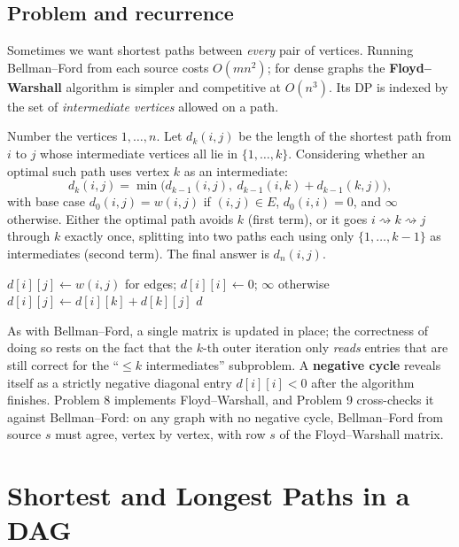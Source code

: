 \documentclass[11pt]{article}
\begin{document}
\subsection{Problem and recurrence}

Sometimes we want shortest paths between \emph{every} pair of vertices. Running Bellman--Ford
from each source costs $O(mn^2)$; for dense graphs the \textbf{Floyd--Warshall} algorithm is
simpler and competitive at $O(n^3)$. Its DP is indexed by the set of \emph{intermediate
vertices} allowed on a path.

Number the vertices $1, \ldots, n$. Let $d_k(i,j)$ be the length of the shortest path from
$i$ to $j$ whose intermediate vertices all lie in $\{1, \ldots, k\}$. Considering whether an
optimal such path uses vertex $k$ as an intermediate:
\[
d_k(i,j) = \min\big(d_{k-1}(i,j),\ d_{k-1}(i,k) + d_{k-1}(k,j)\big),
\]
with base case $d_0(i,j) = w(i,j)$ if $(i,j) \in E$, $d_0(i,i) = 0$, and $\infty$ otherwise.
Either the optimal path avoids $k$ (first term), or it goes $i \rightsquigarrow k
\rightsquigarrow j$ through $k$ exactly once, splitting into two paths each using only
$\{1,\ldots,k-1\}$ as intermediates (second term). The final answer is $d_n(i,j)$.

\begin{algorithm}[h]
\caption{Floyd--Warshall (all-pairs shortest paths)}
\begin{algorithmic}[1]
\State $d[i][j] \gets w(i,j)$ for edges; $d[i][i] \gets 0$; $\infty$ otherwise
                \State $d[i][j] \gets d[i][k] + d[k][j]$
            \EndIf
        \EndFor
    \EndFor
\EndFor
\State \Return $d$
\end{algorithmic}
\end{algorithm}

As with Bellman--Ford, a single matrix is updated in place; the correctness of doing so
rests on the fact that the $k$-th outer iteration only \emph{reads} entries that are still
correct for the ``$\le k$ intermediates'' subproblem. A \textbf{negative cycle} reveals
itself as a strictly negative diagonal entry $d[i][i] < 0$ after the algorithm finishes.
Problem 8 implements Floyd--Warshall, and Problem 9 cross-checks it against Bellman--Ford:
on any graph with no negative cycle, Bellman--Ford from source $s$ must agree, vertex by
vertex, with row $s$ of the Floyd--Warshall matrix.

\section{Shortest and Longest Paths in a DAG}
\end{document}
